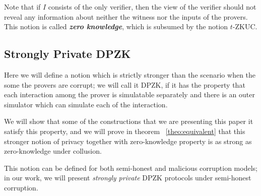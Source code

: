 Note that if $I$ consists of the only verifier, then the view of the verifier should not reveal any information about neither the witness nor the inputs of the provers. This notion is called \textbf{\textit{zero knowledge}}, which is subsumed by the notion $t$-ZKUC.

\subsection{Strongly Private DPZK}
Here we will define a notion which is strictly stronger than the scenario when the some the provers are corrupt; we will call it  DPZK, if it has the property that each interaction among the prover is simulatable separately and there is an outer simulator which can simulate each of the interaction.

We will show that some of the constructions that we are presenting this paper it satisfy this property, and we will prove in theorem ~\ref{theo:equivalent} that this stronger notion of privacy together with zero-knowledge property is as strong as zero-knowledge under collusion.

This notion can be defined for both semi-honest and malicious corruption models; in our work, we will present \textit{strongly private} DPZK protocols under semi-honest corruption.


